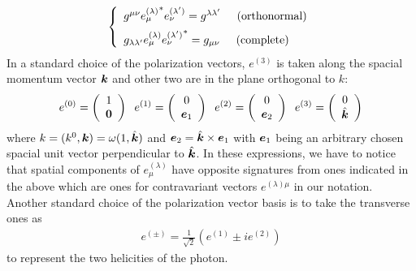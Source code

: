 \begin{eqnarray}
\left\{
\begin{array}{l}
g^{\mu \nu }{e_\mu^{(\lambda)}}^*   e_\nu^{(\lambda')}
=
g^{\lambda \lambda'}
\hspace{5mm}
\mbox{(orthonormal)}
\vspace{2mm}
\\
g_{\lambda \lambda'} e_\mu^{(\lambda)} {e_\nu^{(\lambda')}}^* 
= g_{\mu \nu}
\hspace{5mm}
\mbox{(complete)}
\end{array}
\right.
\label{eqn:photonPolbasisLorentz}
\end{eqnarray}
In a standard choice of the polarization vectors,
$e^{(3)}$ is taken along the spacial momentum vector $\mbox{\boldmath $k$}$ 
and other two are in the plane orthogonal to $k$:
\begin{eqnarray}
e^{(0)} =
\left(
\begin{array}{c}
1\\ \mbox{\boldmath $0$}
\end{array}
\right)
\hspace{2mm}
e^{(1)} =
\left(
\begin{array}{c}
0\\ \mbox{\boldmath $e$}_1
\end{array}
\right)
\hspace{2mm}
e^{(2)} =
\left(
\begin{array}{c}
0\\ \mbox{\boldmath $e$}_2
\end{array}
\right)
\hspace{2mm}
e^{(3)} =
\left(
\begin{array}{c}
0\\ \hat{\mbox{\boldmath $k$}}
\end{array}
\right)
\label{eqn:phopolvecstandardchoice}
\end{eqnarray}
where $k = (k^0, \mbox{\boldmath $k$}) = \omega (1, \hat{\mbox{\boldmath $k$}})$ and
$\mbox{\boldmath $e$}_2 = \hat{\mbox{\boldmath $k$}} \times \mbox{\boldmath $e$}_1$ with
$\mbox{\boldmath $e$}_1$ being an arbitrary chosen spacial unit vector perpendicular 
to $\hat{\mbox{\boldmath $k$}}$.
In these expressions, we have to notice that
spatial components of $e_\mu^{(\lambda)}$ have opposite
signatures from ones indicated in the above which are ones for
 contravariant vectors $e^{(\lambda)\mu}$ in our notation.
Another standard choice of the polarization vector basis is to take
the transverse ones as
\begin{eqnarray}
e^{(\pm)} = \frac{1}{\sqrt{2}} 
\left(
e^{(1)} \pm i e^{(2)}
\right)
\end{eqnarray}
to represent the two helicities of the photon.

